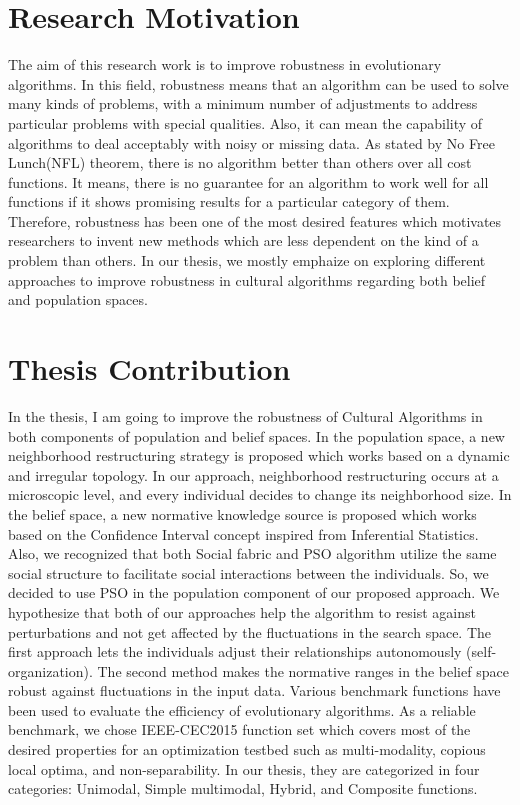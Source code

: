 \section{Research Motivation}
The aim of this research work is to improve robustness in evolutionary algorithms.  In this field, robustness means that an algorithm can be used to solve many kinds of problems, with a minimum number of adjustments to address particular problems with special qualities. Also, it can mean the capability of algorithms to deal acceptably with noisy or missing data.\newline
As stated by No Free Lunch(NFL) theorem, there is no algorithm better than others over all cost functions. It means, there is no guarantee for an algorithm to work well for all functions if it shows promising results for a particular category of them. Therefore, robustness has been one of the most desired features which motivates researchers to invent new methods which are less dependent on the kind of a problem than others. In our thesis, we mostly emphaize on exploring different approaches to improve robustness in cultural algorithms regarding both belief and population spaces.\newline
\section{Thesis Contribution}
In the thesis, I am going to improve the robustness of Cultural Algorithms in both components of population and belief spaces. In the population space, a new neighborhood restructuring strategy is proposed which works based on a dynamic and irregular topology. In our approach, neighborhood restructuring occurs at a microscopic level, and every individual decides to change its neighborhood size. In the belief space, a new normative knowledge source is proposed which works based on the Confidence Interval concept inspired from Inferential Statistics. Also, we recognized that both Social fabric and PSO algorithm utilize the same social structure to facilitate social interactions between the individuals. So, we decided to use PSO in the population component of our proposed approach. We hypothesize that both of our approaches help the algorithm to resist against perturbations and not get affected by the fluctuations in the search space. The first approach lets the individuals adjust their relationships autonomously (self-organization). The second method makes the normative ranges in the belief space robust against fluctuations in the input data. \newline Various benchmark functions have been used to evaluate the efficiency of evolutionary algorithms. As a reliable benchmark, we chose IEEE-CEC2015 function set which covers most of the desired properties for an optimization testbed such as multi-modality, copious local optima, and non-separability. In our thesis, they are categorized in four categories: Unimodal, Simple multimodal, Hybrid, and Composite functions.
